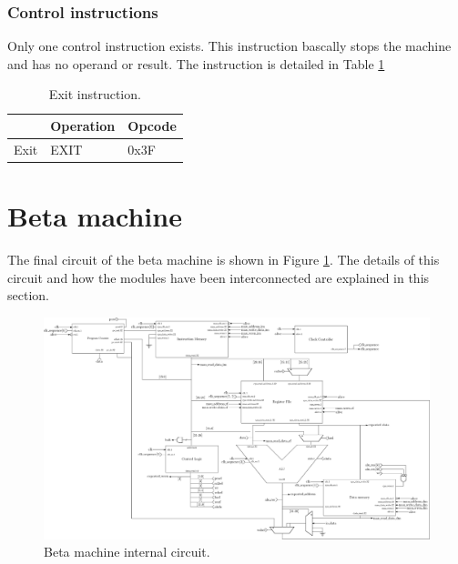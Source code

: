 \subsubsection*{Control instructions}

Only one control instruction exists. This instruction bascally stops the machine and has no operand
or result. The instruction is detailed in Table \ref{tab:instruction/ctrl}

\begin{table}[H]
    \centering
    \begin{tabular}{|l|l|l|}
    \hline
    \rowcolor[HTML]{DAE8FC} 
    \multicolumn{1}{|c|}{\cellcolor[HTML]{DAE8FC}\textbf{Name}} & \multicolumn{1}{c|}{\cellcolor[HTML]{DAE8FC}\textbf{Operation}} & \multicolumn{1}{c|}{\cellcolor[HTML]{DAE8FC}\textbf{Opcode}} \\ \hline
    Exit                                                        & EXIT                                                            & 0x3F                                                         \\ \hline
    \end{tabular}
    \caption{Exit instruction.}
    \label{tab:instruction/ctrl}
\end{table}

\section{Beta machine}

The final circuit of the beta machine is shown in Figure \ref{fig:beta/all}. The details of this 
circuit and how the modules have been interconnected are explained in this section. 

\begin{figure}[H]
    \centering
    \includegraphics[width=\linewidth]{Chapter3-CPU/res/beta_machine_in}
    \caption{Beta machine internal circuit.}
    \label{fig:beta/all}
\end{figure}

